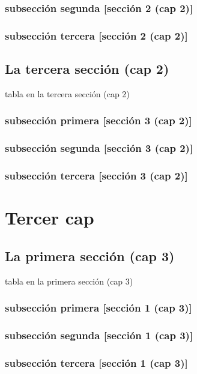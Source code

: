 \documentclass[12pt,a4paper]{report}
\begin{document}
\subsection{subsección segunda [sección 2 (cap 2)]}
\subsection{subsección tercera [sección 2 (cap 2)]}
\section{La tercera sección (cap 2)}
\begin{table}[H]
\caption{tabla en la tercera sección (cap 2)}
\end{table}
\subsection{subsección primera [sección 3 (cap 2)]}
\subsection{subsección segunda [sección 3 (cap 2)]}
\subsection{subsección tercera [sección 3 (cap 2)]}

\chapter{Tercer cap}
\section{La primera sección (cap 3)}
\begin{table}[H]
\caption{tabla en la primera sección (cap 3)}
\end{table}
\subsection{subsección primera [sección 1 (cap 3)]}
\subsection{subsección segunda [sección 1 (cap 3)]}
\subsection{subsección tercera [sección 1 (cap 3)]}
\end{document}
